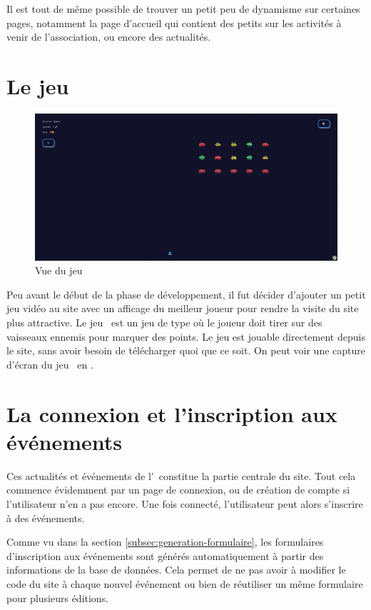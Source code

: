 Il est tout de même possible de trouver un petit peu de dynamisme sur certaines pages, notamment la page d'accueil qui contient des petits  sur les activités à venir de l'association, ou encore des actualités.

\section{Le jeu \game}
\label{sec:jeu}

\begin{figure}[h]
    \centering
    \includegraphics[width=\textwidth]{assets/pictures/game.png}
    \caption{Vue du jeu \game}
    \label{fig:game}
\end{figure}

Peu avant le début de la phase de développement, il fut décider d'ajouter un petit jeu vidéo au site avec un afficage du meilleur joueur pour rendre la visite du site plus attractive. Le jeu \game\ est un jeu de type  où le joueur doit tirer sur des vaisseaux ennemis pour marquer des points. Le jeu est jouable directement depuis le site, sans avoir besoin de télécharger quoi que ce soit. On peut voir une capture d'écran du jeu \game\ en .

\section{La connexion et l'inscription aux événements}
\label{sec:connexion-inscription}

Ces actualités et événements de l'\ofni\ constitue la partie centrale du site. Tout cela commence évidemment par un page de connexion, ou de création de compte si l'utilisateur n'en a pas encore. Une fois connecté, l'utilisateur peut alors s'inscrire à des événements.

Comme vu dans la section \ref{subsec:generation-formulaire}, les formulaires d'inscription aux événements sont générés automatiquement à partir des informations de la base de données. Cela permet de ne pas avoir à modifier le code du site à chaque nouvel événement ou bien de réutiliser un même formulaire pour plusieurs éditions.
\bigskip

